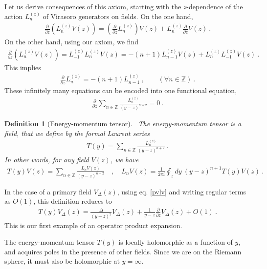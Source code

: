 \documentclass[12pt, a4paper]{article}
\theoremstyle{break}
\newtheorem{defn}[exo]{Definition}
\begin{document}
Let us derive consequences of this axiom, starting with the $z$-dependence of the action $L_n^{(z)}$ of Virasoro generators on fields. On the one hand,
\begin{align}
 \frac{\partial}{\partial z} \left( L_n^{(z)} V(z) \right) = \left(\frac{\partial}{\partial z} L_n^{(z)}\right) V(z) + L_n^{(z)} \frac{\partial}{\partial z} V(z)\ .
\end{align}
On the other hand, using our axiom, we find 
\begin{align}
 \frac{\partial}{\partial z} \left( L_n^{(z)} V(z) \right) = L_{-1}^{(z)} L_n^{(z)} V(z) = -(n+1)L_{n-1}^{(z)} V(z) + L_n^{(z)} L_{-1}^{(z)} V(z)\ .
\end{align}
This implies 
\begin{align}
 \frac{\partial}{\partial z} L_n^{(z)} = -(n+1)L_{n-1}^{(z)}\ ,\qquad (\forall n\in\mathbb{Z})\ .
\end{align}
These infinitely many equations can be encoded into one functional equation,
\begin{align}
 \frac{\partial}{\partial z} \sum_{n\in\mathbb{Z}} \frac{L_n^{(z)}}{(y-z)^{n+2}} = 0\ .
\end{align}

\begin{defn}[Energy-momentum tensor]
 ~\label{def:em}
 The energy-momentum tensor is a field, that we define by the formal Laurent series
 \begin{align}
  T(y) = \sum_{n\in\mathbb{Z}} \frac{L_n^{(z)}}{(y-z)^{n+2}} \ .
 \end{align}
In other words, for any field $V(z)$, we have 
\begin{align}
 T(y)V(z) = \sum_{n\in\mathbb{Z}} \frac{L_n V(z)}{(y-z)^{n+2}}\quad , \quad L_n V(z) = \frac{1}{2\pi i} \oint_{z}dy\ (y-z)^{n+1} T(y)V(z)\ .
 \label{eq:lvtv}
\end{align}
\end{defn}
In the case of a primary field $V_\Delta(z)$, using eq. \eqref{pvlv} and writing regular terms as $O(1)$, this definition reduces to
\begin{align}
 T(y)V_\Delta(z) = \frac{\Delta}{(y-z)^2} V_\Delta(z) + \frac{1}{y-z} \frac{\partial}{\partial z} V_\Delta(z) + O(1)\ . 
 \label{eq:tvd}
\end{align}
This is our first example of an operator product expansion.

The energy-momentum tensor $T(y)$ is locally holomorphic as a function of $y$, and acquires poles in the presence of other fields. Since we are on the Riemann sphere, it must also be holomorphic at $y=\infty$. 
\end{document}
